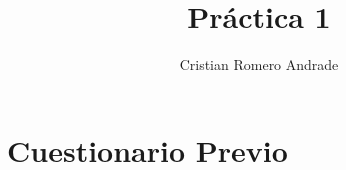 \documentclass{IEEEtran}
\begin{document}
\author{Cristian Romero Andrade}
\title{Práctica 1}
\date{ }
\maketitle{}
\tableofcontents{}

\section{Cuestionario Previo}\label{sec:cuestionario-previo}



\printbibliography{}
\end{document}
